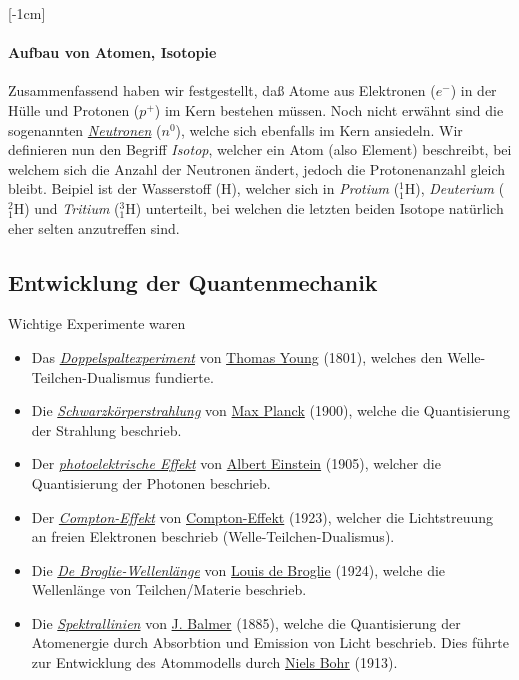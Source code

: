 \documentclass{subfiles}
\begin{document}
    [-1cm]
    \paragraph*{Aufbau von Atomen, Isotopie}
        Zusammenfassend haben wir festgestellt, daß Atome aus Elektronen ($e^-$) in der Hülle und Protonen ($p^+$) im Kern bestehen müssen. Noch nicht erwähnt sind die sogenannten \href{https://de.wikipedia.org/wiki/Neutron}{\emph{Neutronen}} ($n^0$), welche sich ebenfalls im Kern ansiedeln. Wir definieren nun den Begriff \emph{Isotop}, welcher ein Atom (also Element) beschreibt, bei welchem sich die Anzahl der Neutronen ändert, jedoch die Protonenanzahl gleich bleibt. Beipiel ist der Wasserstoff (H), welcher sich in \emph{Protium} ($^1_1\text{H}$), \emph{Deuterium} ($^2_1\text{H}$) und \emph{Tritium} ($^3_1\text{H}$) unterteilt, bei welchen die letzten beiden Isotope natürlich eher selten anzutreffen sind. 

    \subsection{Entwicklung der Quantenmechanik}
        Wichtige Experimente waren
        \begin{itemize}
            \item Das \href{https://de.wikipedia.org/wiki/Doppelspaltexperiment}{\emph{Doppelspaltexperiment}} von \href{https://de.wikipedia.org/wiki/Thomas_Young}{Thomas Young} (1801), welches den Welle-Teilchen-Dualismus fundierte.
            \item Die \href{https://de.wikipedia.org/wiki/Schwarzer_Körper}{\emph{Schwarzkörperstrahlung}} von \href{https://de.wikipedia.org/wiki/Max_Planck}{Max Planck} (1900), welche die Quantisierung der Strahlung beschrieb.
            \item Der \href{https://de.wikipedia.org/wiki/Photoelektrischer_Effekt}{\emph{photoelektrische Effekt}} von \href{https://de.wikipedia.org/wiki/Albert_Einstein}{Albert Einstein} (1905), welcher die Quantisierung der Photonen beschrieb.
            \item Der \href{https://de.wikipedia.org/wiki/Compton-Effekt}{\emph{Compton-Effekt}} von \href{https://de.wikipedia.org/wiki/Compton-Effekt}{Compton-Effekt} (1923), welcher die Lichtstreuung an freien Elektronen beschrieb (Welle-Teilchen-Dualismus).
            \item Die \href{https://de.wikipedia.org/wiki/De_Broglie-Wellenl%C3%A4nge}{\emph{De Broglie-Wellenlänge}} von \href{https://de.wikipedia.org/wiki/Louis_de_Broglie}{Louis de Broglie} (1924), welche die Wellenlänge von Teilchen/Materie beschrieb.
            \item Die \href{https://de.wikipedia.org/wiki/Spektrallinie}{\emph{Spektrallinien}} von \href{https://de.wikipedia.org/wiki/Johann_Jakob_Balmer}{J. Balmer} (1885), welche die Quantisierung der Atomenergie durch Absorbtion und Emission von Licht beschrieb. Dies führte zur Entwicklung des Atommodells durch \href{https://de.wikipedia.org/wiki/Niels_Bohr}{Niels Bohr} (1913).
        \end{itemize}
\end{document}
